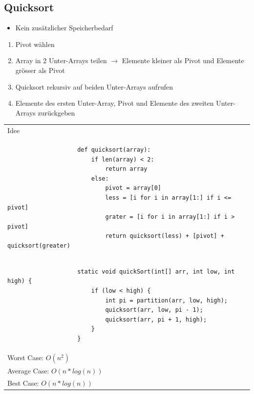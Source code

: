\documentclass[a4paper, landscape, 8pt]{scrartcl}
\begin{document}
\begin{multicols*}{4}
            \subsection{Quicksort}
                \begin{itemize}
                    \item Kein zusätzlicher Speicherbedarf
                \end{itemize}
                \begin{enumerate}
                    \item Pivot wählen
                    \item Array in 2 Unter-Arrays teilen $\to$ Elemente kleiner als Pivot und Elemente grösser als
                    Pivot
                    \item Quicksort rekursiv auf beiden Unter-Arrays aufrufen
                    \item Elemente des ersten Unter-Array, Pivot und Elemente des zweiten Unter-Arrays zurückgeben
                \end{enumerate}
                \begin{tabular}{|l|}
                    \hline
                    \textcolor{subsectioncolor}{Idee} \\
                    \begin{lstlisting}
                    def quicksort(array):
                        if len(array) < 2:
                            return array
                        else:
                            pivot = array[0]
                            less = [i for i in array[1:] if i <= pivot]
                            grater = [i for i in array[1:] if i > pivot]
                            return quicksort(less) + [pivot] + quicksort(greater)
                    \end{lstlisting} \\
                    \hline
                    \begin{lstlisting}
                    static void quickSort(int[] arr, int low, int high) {
                        if (low < high) {
                            int pi = partition(arr, low, high);
                            quicksort(arr, low, pi - 1);
                            quicksort(arr, pi + 1, high);
                        }
                    }
                    \end{lstlisting} \\
                    \hline
                    Worst Case: $O(n^2)$ \\
                    Average Case: $O(n*log(n))$ \\
                    Best Case: $O(n*log(n))$ \\
                    \hline
                \end{tabular}


\end{multicols*}
\end{document}
